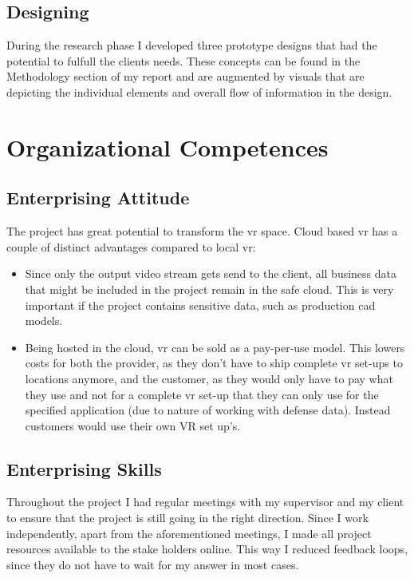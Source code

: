\documentclass[]{article}
\begin{document}
\subsection{Designing}
During the research phase I developed three prototype designs that had the potential to fulfull the clients needs. These concepts can be found in the Methodology section of my report and are augmented by visuals that are depicting the individual elements and overall flow of information in the design.

\section{Organizational Competences}
\subsection{Enterprising Attitude}
The project has great potential to transform the \acrshort{vr} space. Cloud based \acrshort{vr} has a couple of distinct advantages compared to local \acrshort{vr}:
\begin{itemize}
  \item Since only the output video stream gets send to the client, all business data that might be included in the project remain in the safe cloud. This is very important if the project contains sensitive data, such as production \acrshort{cad} models.
  \item Being hosted in the cloud, \acrshort{vr} can be sold as a pay-per-use model. This lowers costs for both the provider, as they don't have to ship complete \acrshort{vr} set-ups to locations anymore, and the customer, as they would only have to pay what they use and not for a complete \acrshort{vr} set-up that they can only use for the specified application (due to nature of working with defense data). Instead customers would use their own VR set up's.
\end{itemize}

\subsection{Enterprising Skills}
Throughout the project I had regular meetings with my supervisor and my client to ensure that the project is still going in the right direction. Since I work independently, apart from the aforementioned meetings, I made all project resources available to the stake holders online. This way I reduced feedback loops, since they do not have to wait for my answer in most cases.
\end{document}
